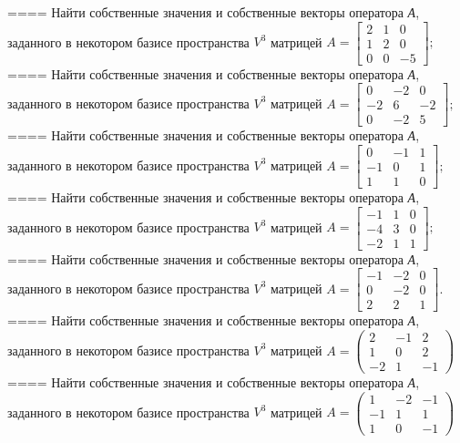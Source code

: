 ====
Найти собственные значения и собственные векторы оператора \emph{А}, заданного в некотором базисе пространства \(V^{3}\) матрицей \(A = \begin{bmatrix}
2 & 1 & 0 \\
1 & 2 & 0 \\
0 & 0 & - 5
\end{bmatrix};\)
====
Найти собственные значения и собственные векторы оператора \emph{А}, заданного в некотором базисе пространства \(V^{3}\) матрицей \(A = \begin{bmatrix}
0 & - 2 & 0 \\
 - 2 & 6 & - 2 \\
0 & - 2 & 5
\end{bmatrix};\)
====
Найти собственные значения и собственные векторы оператора \emph{А}, заданного в некотором базисе пространства \(V^{3}\) матрицей \(A = \begin{bmatrix}
0 & - 1 & 1 \\
 - 1 & 0 & 1 \\
1 & 1 & 0
\end{bmatrix};\)
====
Найти собственные значения и собственные векторы оператора \emph{А}, заданного в некотором базисе пространства \(V^{3}\) матрицей \(A = \begin{bmatrix}
 - 1 & 1 & 0 \\
 - 4 & 3 & 0 \\
 - 2 & 1 & 1
\end{bmatrix};\)
====
Найти собственные значения и собственные векторы оператора \emph{А}, заданного в некотором базисе пространства \(V^{3}\) матрицей \(A = \begin{bmatrix}
 - 1 & - 2 & 0 \\
0 & - 2 & 0 \\
2 & 2 & 1
\end{bmatrix}.\)
====
Найти собственные значения и собственные векторы оператора \emph{А}, заданного в некотором базисе пространства \(V^{3}\) матрицей \(A = \begin{pmatrix}
2 & - 1 & 2 \\
1 & 0 & 2 \\
 - 2 & 1 & - 1
\end{pmatrix}\)
====
Найти собственные значения и собственные векторы оператора \emph{А}, заданного в некотором базисе пространства \(V^{3}\) матрицей \(A = \begin{pmatrix}
1 & - 2 & - 1 \\
 - 1 & 1 & 1 \\
1 & 0 & - 1
\end{pmatrix}\)
